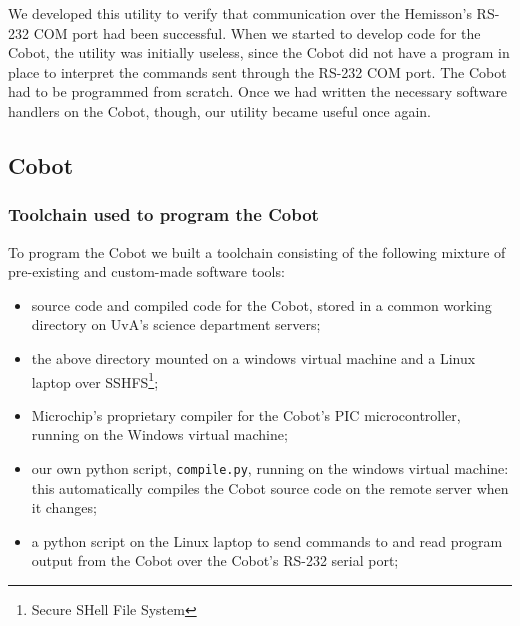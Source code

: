 \documentclass[a4paper,10pt]{article} %
\begin{document}


\noindent We developed this utility to verify that communication over the
Hemisson's RS-232 COM port had been successful. When we started to develop code for the Cobot, the utility was initially useless, since the Cobot did not have a program in place to interpret the commands sent through the RS-232 COM port. The Cobot had to be programmed from scratch. Once we had written the necessary software handlers on the Cobot, though, our utility became useful once again.


\subsection{Cobot} %



\subsubsection{Toolchain used to program the Cobot} %
\label{ssub:Toolchain used to program the Cobot}

To program the Cobot we built a toolchain consisting of the following mixture of
pre-existing and custom-made software tools:

\begin{itemize}
    \item source code and compiled code for the Cobot, stored in a common
    working directory on UvA's science department servers;
    \item  the above directory mounted on a windows virtual machine and a Linux
    laptop over SSHFS\footnote{Secure SHell File System};
    \item Microchip's proprietary compiler for the Cobot's PIC microcontroller,
    running on the Windows virtual machine;
    \item our own python script, \texttt{compile.py}, running on the windows
    virtual machine: this automatically compiles the Cobot source code on the
    remote server when it changes;
    \item a python script on the Linux laptop to send commands to and read program
    output from the Cobot over the Cobot's RS-232 serial port;
\end{itemize}
\end{document}
